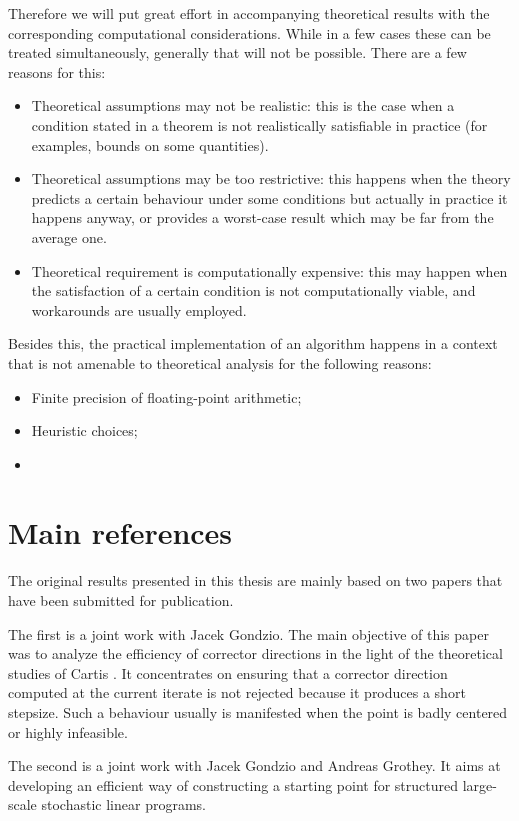 Therefore we will put great effort in accompanying theoretical
results with the corresponding computational considerations. While
in a few cases these can be treated simultaneously, generally that
will not be possible. There are a few reasons for this:
\begin{itemize}
\item Theoretical assumptions may not be realistic: this is the case
when a condition stated in a theorem is not realistically satisfiable 
in practice (for examples, bounds on some quantities). 
\item Theoretical assumptions may be too restrictive: this happens
when the theory predicts a certain behaviour under some conditions
but actually in practice it happens anyway, or provides a worst-case 
result which may be far from the average one.
\item Theoretical requirement is computationally expensive: this 
may happen when the satisfaction of a certain condition is not 
computationally viable, and workarounds are usually employed.
\end{itemize}

Besides this, the practical implementation of an algorithm happens
in a context that is not amenable to theoretical analysis for the
following reasons:
\begin{itemize}
\item Finite precision of floating-point arithmetic;
\item Heuristic choices;
\item 
\end{itemize}

%
%
\section{Main references}

The original results presented in this thesis are mainly based on two
papers that have been submitted for publication.

The first \cite{ColomboGondzio05} is a joint work with Jacek Gondzio.
The main objective of this paper was to analyze the efficiency of
corrector directions in the light of the theoretical studies of Cartis
\cite{Cartis04,Cartis05}. It concentrates on ensuring that a corrector
direction computed at the current iterate is not rejected because it
produces a short stepsize. Such a behaviour usually is manifested when
the point is badly centered or highly infeasible.

The second \cite{ColomboGondzioGrothey06} is a joint work with
Jacek Gondzio and Andreas Grothey. It aims at developing an
efficient way of constructing a starting point for structured 
large-scale stochastic linear programs.
